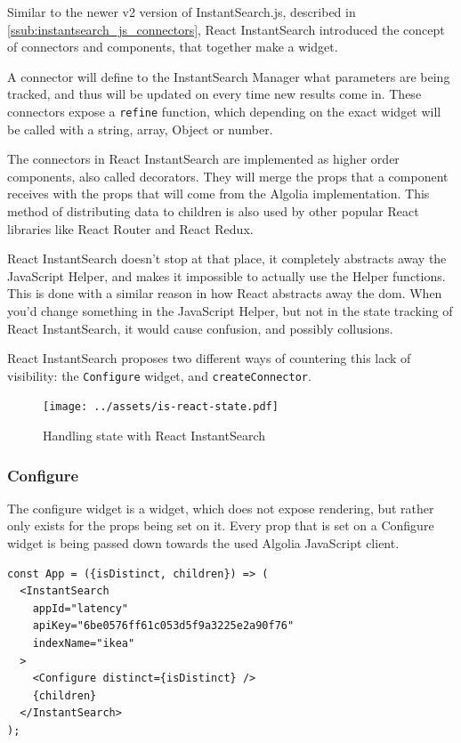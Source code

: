 Similar to the newer v2 version of InstantSearch.js, described in \ref{ssub:instantsearch_js_connectors}, React InstantSearch introduced the concept of connectors and components, that together make a widget.

A connector will define to the InstantSearch Manager what parameters are being tracked, and thus will be updated on every time new results come in. These connectors expose a {\tt refine} function, which depending on the exact widget will be called with a string, array, Object or number.

The connectors in React InstantSearch are implemented as higher order components, also called decorators. They will merge the \gls{props} that a component receives with the \gls{props} that will come from the Algolia implementation. This method of distributing data to children is also used by other popular React libraries like React Router and React Redux.

React InstantSearch doesn't stop at that place, it completely abstracts away the JavaScript Helper, and makes it impossible to actually use the Helper functions. This is done with a similar reason in how React abstracts away the \acrshort{dom}. When you'd change something in the JavaScript Helper, but not in the state tracking of React InstantSearch, it would cause confusion, and possibly collusions.

React InstantSearch proposes two different ways of countering this lack of visibility: the {\tt Configure} widget, and {\tt createConnector}.

\begin{figure}[H]
  \centering
  \texttt{[image: ../assets/is-react-state.pdf]}
  \caption{Handling state with React InstantSearch}
  \label{figure:is-react-state}
\end{figure}

\subsubsection{Configure}
\label{ssub:ris-configure}

The configure widget is a widget, which does not expose rendering, but rather only exists for the \gls{props} being set on it. Every prop that is set on a Configure widget is being passed down towards the used Algolia JavaScript client.

\begin{minipage}{\linewidth}
\begin{lstlisting}[caption={Configure in an InstantSearch container},label={lst:ris-configure}]
const App = ({isDistinct, children}) => (
  <InstantSearch
    appId="latency"
    apiKey="6be0576ff61c053d5f9a3225e2a90f76"
    indexName="ikea"
  >
    <Configure distinct={isDistinct} />
    {children}
  </InstantSearch>
);
\end{lstlisting}
\end{minipage}

